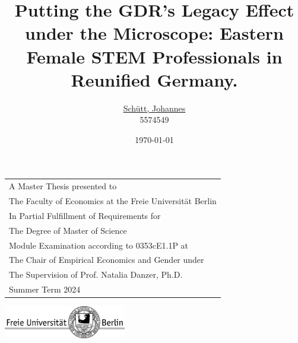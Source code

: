 \documentclass[a4paper, oneside, hyperfootnotes = false]{article}
\title{Putting the GDR's Legacy Effect under the Microscope: \linebreak Eastern Female STEM Professionals in Reunified Germany.}
\author{\href{mailto:johannes.schuett@fu-berlin.de}{Schütt, Johannes} \\
5574549}
\date{\today{}}
\begin{document}
{\fontsize{12pt}{18pt}\selectfont

\maketitle

\thispagestyle{empty}

\vspace{1.5cm}

\noindent\begin{tabular}{l}
	A Master Thesis presented to \\
	The Faculty of Economics at the Freie Universität Berlin \\
    [\normalbaselineskip]
    In Partial Fulfillment of Requirements for \\
    The Degree of Master of Science \\
    [\normalbaselineskip]
    Module Examination according to 0353cE1.1P at \\
    The Chair of Empirical Economics and Gender under \\
    The Supervision of Prof. Natalia Danzer, Ph.D. \\
    [\normalbaselineskip]
    Summer Term 2024
\end{tabular}

\vspace{3cm}

\begin{center}
    \includegraphics[width=0.4\textwidth, angle=0]{fu_logo.pdf}
\end{center}

\newpage

\pagestyle{plain}

{\fontsize{12pt}{15pt}\selectfont

\tableofcontents
\newpage

{}
\listoffigures

\vspace{2cm}

{}
\listoftables


\vspace{2cm}

}}
\end{document}
